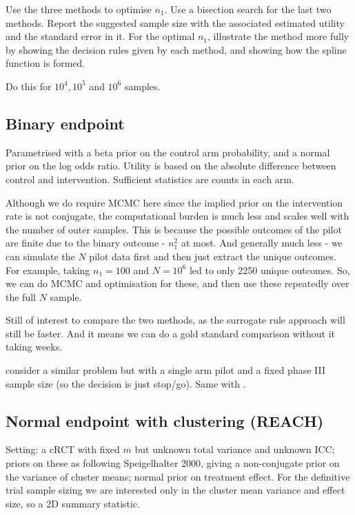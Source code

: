 \documentclass[sagev, Crown]{sagej} %
\begin{document}
Use the three methods to optimise $n_1$. Use a bisection search for the last two methods. Report the suggested sample size with the associated estimated utility and the standard error in it. For the optimal $n_1$, illustrate the method more fully by showing the decision rules given by each method, and showing how the spline function is formed. 

Do this for $10^4, 10^5$ and $10^6$ samples.

\subsection{Binary endpoint}

Parametrised with a beta prior on the control arm probability, and a normal prior on the log odds ratio. Utility is based on the absolute difference between control and intervention. Sufficient statistics are counts in each arm. 

Although we do require MCMC here since the implied prior on the intervention rate is not conjugate, the computational burden is much less and scales well with the number of outer samples. This is because the possible outcomes of the pilot are finite due to the binary outcome - $n_1^2$ at most. And generally much less - we can simulate the $N$ pilot data first and then just extract the unique outcomes. For example, taking $n_1 = 100$ and $N = 10^6$ led to only 2250 unique outcomes. So, we can do MCMC and optimisation for these, and then use these repeatedly over the full $N$ sample.

Still of interest to compare the two methods, as the surrogate rule approach will still be faster. And it means we can do a gold standard comparison without it taking weeks.

\cite{Brunier1994} consider a similar problem but with a single arm pilot and a fixed phase III sample size (so the decision is just stop/go). Same with \cite{Stallard1998}.

\subsection{Normal endpoint with clustering (REACH)}

Setting: a cRCT with fixed $m$ but unknown total variance and unknown ICC; priors on these as following Speigelhalter 2000, giving a non-conjugate prior on the variance of cluster means; normal prior on treatment effect. For the definitive trial sample sizing we are interested only in the cluster mean variance and effect size, so a 2D summary statistic.
\end{document}

